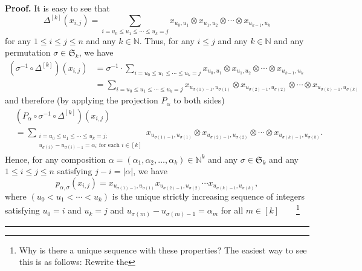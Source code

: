 \documentclass[numbers=enddot,12pt,final,onecolumn,notitlepage]{scrartcl}%
\theoremstyle{definition}
\newenvironment{proof}[1][Proof]{\noindent\textbf{#1.} }{\ \rule{0.5em}{0.5em}}
\let\sumnonlimits\sum
\renewcommand{\sum}{\sumnonlimits\limits}
\begin{document}
\begin{proof}
It is easy to see that%
\[
\Delta^{\left[  k\right]  }\left(  x_{i,j}\right)  =\sum_{i=u_{0}\leq
u_{1}\leq\cdots\leq u_{k}=j}x_{u_{0},u_{1}}\otimes x_{u_{1},u_{2}}%
\otimes\cdots\otimes x_{u_{k-1},u_{k}}%
\]
for any $1\leq i\leq j\leq n$ and any $k\in\mathbb{N}$. Thus, for any $i\leq
j$ and any $k\in\mathbb{N}$ and any permutation $\sigma\in\mathfrak{S}_{k}$,
we have%
\begin{align*}
\left(  \sigma^{-1}\circ\Delta^{\left[  k\right]  }\right)  \left(
x_{i,j}\right)   &  =\sigma^{-1}\cdot\sum_{i=u_{0}\leq u_{1}\leq\cdots\leq
u_{k}=j}x_{u_{0},u_{1}}\otimes x_{u_{1},u_{2}}\otimes\cdots\otimes
x_{u_{k-1},u_{k}}\\
&  =\sum_{i=u_{0}\leq u_{1}\leq\cdots\leq u_{k}=j}x_{u_{\sigma\left(
1\right)  -1},u_{\sigma\left(  1\right)  }}\otimes x_{u_{\sigma\left(
2\right)  -1},u_{\sigma\left(  2\right)  }}\otimes\cdots\otimes x_{u_{\sigma
\left(  k\right)  -1},u_{\sigma\left(  k\right)  }}%
\end{align*}
and therefore (by applying the projection $P_{\alpha}$ to both sides)%
\begin{align*}
&  \left(  P_{\alpha}\circ\sigma^{-1}\circ\Delta^{\left[  k\right]  }\right)
\left(  x_{i,j}\right) \\
&  =\sum_{\substack{i=u_{0}\leq u_{1}\leq\cdots\leq u_{k}=j;\\u_{\sigma\left(
i\right)  }-u_{\sigma\left(  i\right)  -1}=\alpha_{i}\text{ for each }%
i\in\left[  k\right]  }}x_{u_{\sigma\left(  1\right)  -1},u_{\sigma\left(
1\right)  }}\otimes x_{u_{\sigma\left(  2\right)  -1},u_{\sigma\left(
2\right)  }}\otimes\cdots\otimes x_{u_{\sigma\left(  k\right)  -1}%
,u_{\sigma\left(  k\right)  }}.
\end{align*}
Hence, for any composition $\alpha=\left(  \alpha_{1},\alpha_{2},\ldots
,\alpha_{k}\right)  \in\mathbb{N}^{k}$ and any $\sigma\in\mathfrak{S}_{k}$ and
any $1\leq i\leq j\leq n$ satisfying $j-i=\left\vert \alpha\right\vert $, we
have
\[
p_{\alpha,\sigma}\left(  x_{i,j}\right)  =x_{u_{\sigma\left(  1\right)
-1},u_{\sigma\left(  1\right)  }}x_{u_{\sigma\left(  2\right)  -1}%
,u_{\sigma\left(  2\right)  }}\cdots x_{u_{\sigma\left(  k\right)
-1},u_{\sigma\left(  k\right)  }},
\]
where $\left(  u_{0}<u_{1}<\cdots<u_{k}\right)  $ is the unique strictly
increasing sequence of integers satisfying $u_{0}=i$ and $u_{k}=j$ and
$u_{\sigma\left(  m\right)  }-u_{\sigma\left(  m\right)  -1}=\alpha_{m}$ for
all $m\in\left[  k\right]  $\ \ \ \ \footnote{Why is there a unique sequence
with these properties? The easiest way to see this is as follows: Rewrite the
}
\end{proof}
\end{document}
